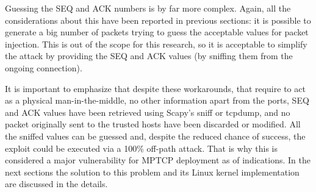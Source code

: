 Guessing the SEQ and ACK numbers is by far more complex. Again, all the considerations about this have been reported in previous sections: it is possible to generate a big number of packets trying to guess the acceptable values for packet injection. This is out of the scope for this research, so it is acceptable to simplify the attack by providing the SEQ and ACK values (by sniffing them from the ongoing connection).

It is important to emphasize that despite these workarounds, that require to act as a physical man-in-the-middle, no other information apart from the ports, SEQ and ACK values have been retrieved using Scapy's sniff or tcpdump, and no packet originally sent to the trusted hosts have been discarded or modified. All the sniffed values can be guessed and, despite the reduced chance of success, the exploit could be executed via a 100\% off-path attack. That is why this is considered a major vulnerability for MPTCP deployment as of  indications. In the next sections the solution to this problem and its Linux kernel implementation are discussed in the details.